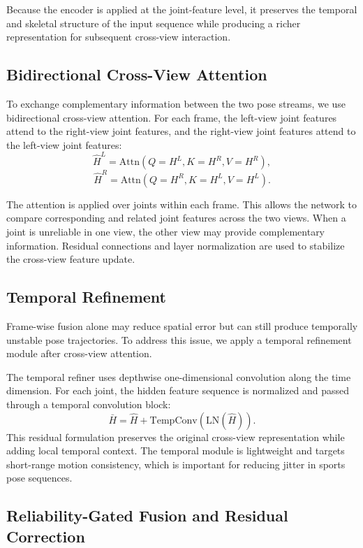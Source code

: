 \documentclass[preprint,12pt]{elsarticle}
\begin{document}
Because the encoder is applied at the joint-feature level, it preserves the temporal and skeletal structure of the input sequence while producing a richer representation for subsequent cross-view interaction.

\subsection{Bidirectional Cross-View Attention}
\label{subsec:cross_view_attention}

To exchange complementary information between the two pose streams, we use bidirectional cross-view attention. For each frame, the left-view joint features attend to the right-view joint features, and the right-view joint features attend to the left-view joint features:
\[
\hat{H}^{L}
=
\mathrm{Attn}(Q=H^{L}, K=H^{R}, V=H^{R}),
\]
\[
\hat{H}^{R}
=
\mathrm{Attn}(Q=H^{R}, K=H^{L}, V=H^{L}).
\]

The attention is applied over joints within each frame. This allows the network to compare corresponding and related joint features across the two views. When a joint is unreliable in one view, the other view may provide complementary information. Residual connections and layer normalization are used to stabilize the cross-view feature update.

\subsection{Temporal Refinement}
\label{subsec:temporal_refinement}

Frame-wise fusion alone may reduce spatial error but can still produce temporally unstable pose trajectories. To address this issue, we apply a temporal refinement module after cross-view attention.

The temporal refiner uses depthwise one-dimensional convolution along the time dimension. For each joint, the hidden feature sequence is normalized and passed through a temporal convolution block:
\[
\bar{H} = \hat{H} + \mathrm{TempConv}(\mathrm{LN}(\hat{H})).
\]
This residual formulation preserves the original cross-view representation while adding local temporal context. The temporal module is lightweight and targets short-range motion consistency, which is important for reducing jitter in sports pose sequences.

\subsection{Reliability-Gated Fusion and Residual Correction}
\label{subsec:reliability_fusion}
\end{document}
